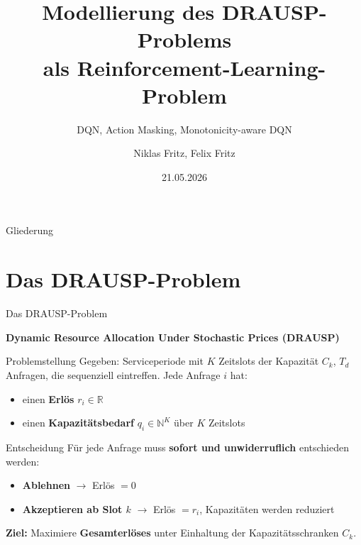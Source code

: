 \documentclass[aspectratio=169]{beamer}
\title[DRAUSP als RL-Problem]{Modellierung des DRAUSP-Problems\\als Reinforcement-Learning-Problem}
\subtitle{DQN, Action Masking, Monotonicity-aware DQN}
\author{Niklas Fritz, Felix Fritz}
\date{21.05.2026}
\begin{document}

\begin{frame}
  \titlepage
\end{frame}

\begin{frame}{Gliederung}
  \tableofcontents
\end{frame}

\section{Das DRAUSP-Problem}

\begin{frame}{Das DRAUSP-Problem}

  \textbf{Dynamic Resource Allocation Under Stochastic Prices (DRAUSP)}

  \begin{block}{Problemstellung}
    Gegeben: Serviceperiode mit $K$ Zeitslots der Kapazität $C_k$, $T_d$ Anfragen, die sequenziell eintreffen. Jede Anfrage $i$ hat:
    \begin{itemize}
      \item einen \textbf{Erlös} $r_i \in \mathbb{R}$
      \item einen \textbf{Kapazitätsbedarf} $q_i \in \mathbb{N}^K$ über $K$ Zeitslots
    \end{itemize}
  \end{block}

  \bigskip
  \begin{block}{Entscheidung}
    Für jede Anfrage muss \textbf{sofort und unwiderruflich} entschieden werden:
    \begin{itemize}
      \item \textbf{Ablehnen} $\rightarrow$ Erlös $= 0$
      \item \textbf{Akzeptieren ab Slot $k$} $\rightarrow$ Erlös $= r_i$, Kapazitäten werden reduziert
    \end{itemize}
  \end{block}

  \textbf{Ziel:} Maximiere \textbf{Gesamterlöses} unter Einhaltung der Kapazitätsschranken $C_k$.

\end{frame}
\end{document}
